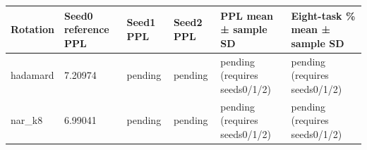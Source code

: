 \begin{tabular}{llllll}
\toprule
Rotation & Seed0 reference PPL & Seed1 PPL & Seed2 PPL & PPL mean ± sample SD & Eight-task \% mean ± sample SD \\
\midrule
hadamard & 7.20974 & pending & pending & pending (requires seeds0/1/2) & pending (requires seeds0/1/2) \\
nar\_k8 & 6.99041 & pending & pending & pending (requires seeds0/1/2) & pending (requires seeds0/1/2) \\
\bottomrule
\end{tabular}
